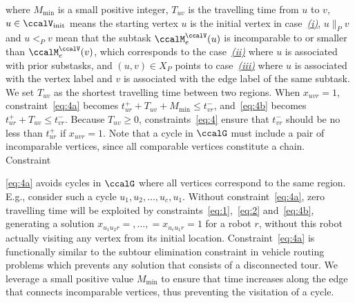 \documentclass[Afour,sageh,times]{sagej}
\begin{document}
where $M_{\text{min}}$ is a small positive integer, $T_{uv}$ is the travelling time from $u$ to $v$, $u \in \ccalV_{\text{init}}$ means the starting vertex $u$ is the initial vertex in case~\hyperref[sec:a]{{\it (i)}}, $u \|_{P} v$ and $u<_{P} v$ mean that the subtask $\ccalM^\ccalV_{{e}}(u)$ is incomparable to or smaller than $\ccalM^\ccalV_e(v)$, which corresponds to the case~\hyperref[sec:b]{{\it (ii)}} where $u$ is associated with prior substasks, and $(u,v)\in X_P$ points to case~\hyperref[sec:c]{{\it (iii)}} where $u$ is associated with the vertex label and $v$ is associated with the edge label of the same subtask. We set $T_{uv}$ as the shortest travelling time between two regions. When $x_{uvr}=1$, constraint~\eqref{eq:4a} becomes $t_{ur}^+  + T_{uv} + M_{\text{min}}   \leq t_{vr}^-$, and~\eqref{eq:4b} becomes $t_{ur}^+  + T_{uv}  \leq t_{vr}^-$. Because $T_{uv} \geq 0$, constraints~\eqref{eq:4} ensure that $t_{vr}^-$ should be no less than $t_{ur}^+$ if $x_{uvr}=1$. Note that a cycle in $\ccalG$ must include a pair of incomparable vertices, since all comparable vertices constitute a chain. Constraint~{\eqref{eq:4a} avoids cycles in $\ccalG$ where all vertices correspond to the same region. E.g., consider such a cycle $u_1,u_2,\ldots, u_c, u_1$. Without  constraint~\eqref{eq:4a}, zero travelling time will be exploited by constraints~\eqref{eq:1},~\eqref{eq:2} and~\eqref{eq:4b}, generating a solution $x_{u_1 u_2 r} = ,\ldots,=x_{u_c u_{1} r}= 1$ for a robot $r$, without this robot actually visiting any vertex from its initial location.  Constraint~\eqref{eq:4a} is functionally similar to the subtour elimination constraint in vehicle routing problems which prevents any solution that consists of a disconnected tour. We leverage a small positive value $M_{\text{min}}$ to ensure that time increases along the edge that connects incomparable vertices, thus preventing the visitation of a cycle.

}
\end{document}
